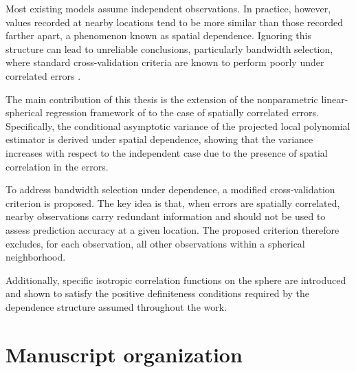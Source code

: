 \documentclass[12pt]{report} %
\begin{document}
Most existing models assume independent observations. In practice, however, values recorded at nearby locations tend to be more similar than those recorded farther apart, a phenomenon known as spatial dependence. Ignoring this structure can lead to unreliable conclusions, particularly bandwidth selection, where standard cross-validation criteria are known to perform poorly under correlated errors \citep{Opsomer2001}.

The main contribution of this thesis is the extension of the nonparametric linear-spherical regression framework of \citet{Garcia-Portugues2016} to the case of spatially correlated errors. Specifically, the conditional asymptotic variance of the projected local polynomial estimator is derived under spatial dependence, showing that the variance increases with respect to the independent case due to the presence of spatial correlation in the
errors.

To address bandwidth selection under dependence, a modified cross-validation criterion is proposed. The key idea is that, when errors are spatially correlated, nearby observations carry redundant information and should not be used to assess prediction accuracy at a given location. The proposed criterion therefore excludes, for each observation, all other observations within a spherical neighborhood. 

Additionally, specific isotropic correlation functions on the sphere are introduced and shown to satisfy the positive definiteness conditions required by the dependence structure assumed throughout the work.



\section{Manuscript organization}
\end{document}
